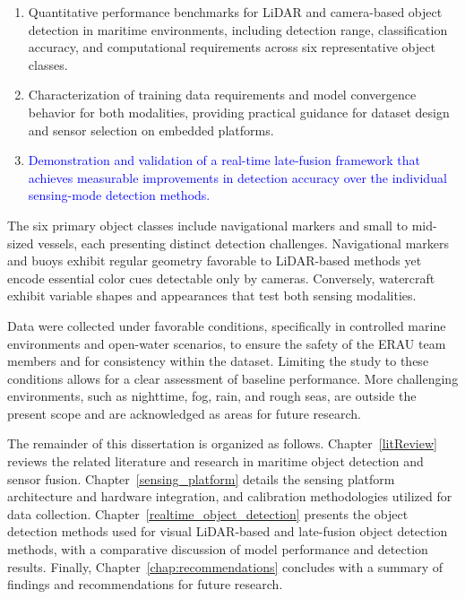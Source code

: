 \documentclass{erauthesis}
\begin{document}
\begin{enumerate}
    \item Quantitative performance benchmarks for \ac{LiDAR} and camera-based object detection in maritime environments, including detection range, classification accuracy, and computational requirements across six representative object classes.
    \item Characterization of training data requirements and model convergence behavior for both modalities, providing practical guidance for dataset design and sensor selection on embedded platforms.
    \item \textcolor{blue}{Demonstration and validation of a real-time late-fusion framework that achieves measurable improvements in detection accuracy over the individual sensing-mode detection methods.}
\end{enumerate}


The six primary object classes include navigational markers and small to mid-sized vessels, each presenting distinct detection challenges. 
Navigational markers and buoys exhibit regular geometry favorable to \ac{LiDAR}-based methods yet encode essential color cues detectable only by cameras. 
Conversely, watercraft exhibit variable shapes and appearances that test both sensing modalities.

Data were collected under favorable conditions, specifically in controlled marine environments and open-water scenarios, to ensure the safety of the ERAU team members and for consistency within the dataset. 
Limiting the study to these conditions allows for a clear assessment of baseline performance. 
More challenging environments, such as nighttime, fog, rain, and rough seas, are outside the present scope and are acknowledged as areas for future research.

The remainder of this dissertation is organized as follows.  
Chapter~\ref{litReview} reviews the related literature and research in maritime object detection and sensor fusion. 
Chapter~\ref{sensing_platform} details the sensing platform architecture and hardware integration, and calibration methodologies utilized for data collection.  
Chapter~\ref{realtime_object_detection} presents the object detection methods used for visual LiDAR-based and late-fusion object detection methods, with a comparative discussion of model performance and detection results.  
Finally, Chapter~\ref{chap:recommendations} concludes with a summary of findings and recommendations for future research.
\end{document}
